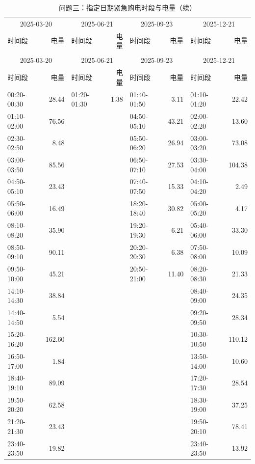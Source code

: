 {\footnotesize\setlength{\tabcolsep}{3pt}
\begin{longtable}{lr|lr|lr|lr}
\caption{问题三：指定日期紧急购电时段与电量（kWh）}\\
\toprule
\multicolumn{2}{c}{2025-03-20} & \multicolumn{2}{c}{2025-06-21} & \multicolumn{2}{c}{2025-09-23} & \multicolumn{2}{c}{2025-12-21}\\
时间段 & 电量 & 时间段 & 电量 & 时间段 & 电量 & 时间段 & 电量\\\midrule\endfirsthead
\caption[]{问题三：指定日期紧急购电时段与电量（续）}\\
\toprule
\multicolumn{2}{c}{2025-03-20} & \multicolumn{2}{c}{2025-06-21} & \multicolumn{2}{c}{2025-09-23} & \multicolumn{2}{c}{2025-12-21}\\
时间段 & 电量 & 时间段 & 电量 & 时间段 & 电量 & 时间段 & 电量\\\midrule\endhead
00:20-00:30 & 28.44 & 01:20-01:30 & 1.38 & 01:40-01:50 & 3.11 & 01:10-01:20 & 22.42\\
01:10-02:00 & 76.56 &  &  & 04:50-05:10 & 43.21 & 02:00-02:20 & 13.60\\
02:30-02:50 & 8.48 &  &  & 05:50-06:20 & 26.94 & 03:00-03:20 & 73.08\\
03:00-03:50 & 85.56 &  &  & 06:50-07:10 & 27.53 & 03:30-04:00 & 104.38\\
04:50-05:10 & 23.43 &  &  & 07:40-07:50 & 15.33 & 04:10-04:20 & 2.49\\
05:50-06:00 & 16.49 &  &  & 18:20-18:40 & 30.82 & 05:00-05:20 & 4.17\\
08:10-08:20 & 35.90 &  &  & 19:20-19:30 & 6.21 & 05:40-06:00 & 33.30\\
08:50-09:10 & 90.11 &  &  & 20:20-20:30 & 6.38 & 07:50-08:00 & 10.09\\
09:50-10:00 & 45.21 &  &  & 20:50-21:00 & 11.40 & 08:20-08:30 & 21.33\\
14:10-14:30 & 38.84 &  &  &  &  & 08:40-09:00 & 24.35\\
14:40-14:50 & 5.54 &  &  &  &  & 09:20-09:50 & 28.34\\
15:20-16:20 & 162.60 &  &  &  &  & 10:30-10:50 & 110.12\\
16:50-17:00 & 1.84 &  &  &  &  & 13:50-14:00 & 10.60\\
18:40-19:10 & 89.09 &  &  &  &  & 17:20-17:30 & 28.54\\
19:50-20:20 & 62.58 &  &  &  &  & 18:30-19:00 & 37.25\\
21:20-21:30 & 23.43 &  &  &  &  & 19:50-20:10 & 78.41\\
23:40-23:50 & 19.82 &  &  &  &  & 23:40-23:50 & 13.92\\
\bottomrule\end{longtable}}
